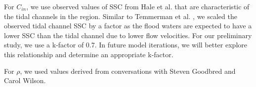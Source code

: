 \documentclass[9pt,twocolumn,twoside,lineno]{pnas-new}
\begin{document}
For $C_{in}$, we use observed values of SSC from Hale et al. \cite{haleObservationsScalingTidal2019} that are characteristic of the tidal channels in the region. Similar to Temmerman et al. \cite{temmermanModellingLongtermTidal2003,temmermanModellingEstuarineVariations2004}, we scaled the observed tidal channel SSC by a factor as the flood waters are expected to have a lower SSC than the tidal channel due to lower flow velocities. For our preliminary study, we use a k-factor of 0.7. In future model iterations, we will better explore this relationship and determine an appropriate k-factor.

For $\rho$, we used values derived from conversations with Steven Goodbred and Carol Wilson.


\showmatmethods{} %


\showacknow{} %


\end{document}
